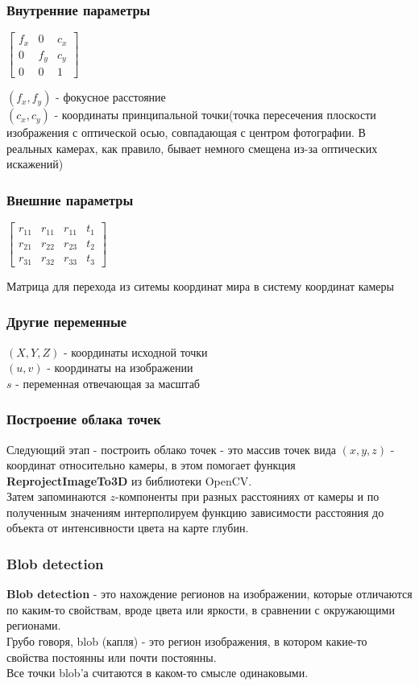 \documentclass{beamer}
\begin{document}
		\begin{frame}
			\frametitle{Внутренние параметры}
			\begin{center}
			$
			\begin{bmatrix}
			f_{x}&0&c_{x}\\
			0&f_{y}&c_{y}\\
			0&0&1
			\end{bmatrix}
			$
			\end{center}
			$(f_{x},f_{y})$ - фокусное расстояние\\
			$(c_{x},c_{y})$ - координаты принципальной точки(точка пересечения плоскости изображения с оптической осью, совпадающая с центром фотографии. В реальных камерах, как правило, бывает немного смещена из-за оптических искажений)
		\end{frame}				
		\begin{frame}
			\frametitle{Внешние параметры}
			\begin{center}
			$
			\begin{bmatrix}
			r_{11}&r_{11}&r_{11}&t_{1}\\
			r_{21}&r_{22}&r_{23}&t_{2}\\
			r_{31}&r_{32}&r_{33}&t_{3}
			\end{bmatrix}
			$
			\end{center}
			Матрица для перехода из ситемы координат мира в систему координат камеры
		\end{frame}				
		\begin{frame}
			\frametitle{Другие переменные}
			$(X,Y,Z)$ - координаты исходной точки\\
			$(u,v)$ - координаты на изображении\\
			$s$ - переменная отвечающая за масштаб
		\end{frame}
		\begin{frame}
			\frametitle{Построение облака точек}
			
			Следующий этап - построить облако точек - это массив
			точек вида $(x, y, z)$ - координат относительно камеры, в
			этом помогает функция \textbf{ReprojectImageTo3D} из библиотеки
			OpenCV.\\
			Затем запоминаются $z$-компоненты при разных расстояниях от камеры
			и по полученным значениям интерполируем функцию зависимости
			расстояния до объекта от интенсивности цвета на карте глубин.
			
		\end{frame}
		
		\begin{frame}
			\frametitle{Blob detection}
			
			\textbf{Blob detection} - это нахождение регионов на изображении,
			которые отличаются по каким-то свойствам, вроде цвета
			или яркости, в сравнении с окружающими регионами.\\
			Грубо говоря, blob (капля) - это регион изображения,
			в котором какие-то свойства постоянны или почти
			постоянны.\\
			Все точки blob'а считаются в каком-то смысле
			одинаковыми.\\
			
		\end{frame}
		
\end{document}
